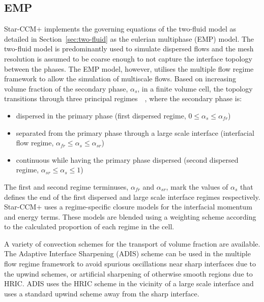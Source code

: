 \subsection{EMP}
Star-CCM+ implements the governing equations of the two-fluid model as detailed in Section~\ref{sec:two-fluid} as the eulerian multiphase (EMP) model. 
 The two-fluid model is predominantly used to simulate dispersed flows and the mesh resolution is
 assumed to be coarse enough to not capture the interface topology between the phases. The EMP model,
 however, utilises the multiple flow regime framework to allow the simulation of multiscale flows.
 Based on increasing volume fraction of the
 secondary phase, $\alpha_{s}$, in a finite volume cell,
 the topology transitions through three principal 
 regimes~\cite{gadaLargeScaleInterface2017}~, where the secondary phase is:
 \begin{itemize}
    \item dispersed in the primary phase (first dispersed regime, $0 \le \alpha_{s} \le \alpha_{fr} $)
    \item separated from the primary phase through a large scale interface (interfacial flow regime, $\alpha_{fr} \le \alpha_{s} \le \alpha_{sr} $) 
    \item continuous while having the primary phase dispersed (second dispersed regime, $\alpha_{sr} \le \alpha_{s} \le 1 $)
 \end{itemize}
The first and second regime terminuses, $\alpha_{fr}$ and $\alpha_{sr}$, mark the values of $\alpha_{s}$
that defines the end of the first dispersed and large scale interface regimes respectively. Star-CCM+ uses a regime-specific closure models for 
 the interfacial momentum and energy terms. These models are blended using a weighting
 scheme according to the calculated proportion of each regime in the cell.

A variety of convection schemes for the transport of volume fraction are available. The Adaptive Interface Sharpening (ADIS) scheme can be
 used in the multiple flow regime framework to avoid spurious oscillations near sharp interfaces due to
 the upwind schemes,
 or artificial sharpening of otherwise smooth regions due to HRIC.
 ADIS uses the HRIC scheme in the vicinity of a large scale interface and uses a standard 
 upwind scheme away from the sharp interface.~
~

